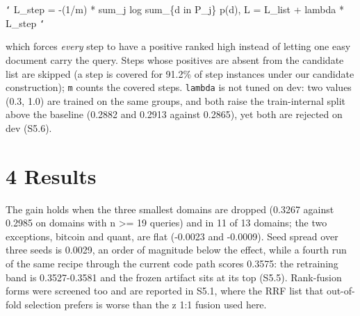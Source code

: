 \documentclass[11pt]{article}
\begin{document}
\texttt{`} L\_step = -(1/m) * sum\_j log sum\_\{d in P\_j\} p(d),    L = L\_list + lambda * L\_step \texttt{`}

which forces \emph{every} step to have a positive ranked high instead of letting one easy document carry the query. Steps whose positives are absent from the candidate list are skipped (a step is covered for 91.2\% of step instances under our candidate construction); \texttt{m} counts the covered steps. \texttt{lambda} is not tuned on dev: two values (0.3, 1.0) are trained on the same groups, and both raise the train-internal split above the baseline (0.2882 and 0.2913 against 0.2865), yet both are rejected on dev (S5.6).

\section*{4 Results}
\begin{table}[t]
\centering
\footnotesize
{}%
\end{table}

The gain holds when the three smallest domains are dropped (0.3267 against 0.2985 on domains with n >= 19 queries) and in 11 of 13 domains; the two exceptions, bitcoin and quant, are flat (-0.0023 and -0.0009). Seed spread over three seeds is 0.0029, an order of magnitude below the effect, while a fourth run of the same recipe through the current code path scores 0.3575: the retraining band is 0.3527-0.3581 and the frozen artifact sits at its top (S5.5). Rank-fusion forms were screened too and are reported in S5.1, where the RRF list that out-of-fold selection prefers is worse than the z 1:1 fusion used here.
\end{document}
